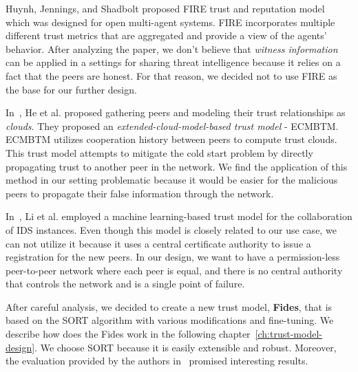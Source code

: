 Huynh, Jennings, and Shadbolt proposed FIRE trust and reputation model~\cite{huynh2006integrated} which was designed for open multi-agent systems.
FIRE incorporates multiple different trust metrics that are aggregated and provide a view of the agents' behavior.
After analyzing the paper, we don't believe that \textit{witness information}~\cite{huynh2006integrated} can be applied in a settings for sharing threat intelligence because it relies on a fact that the peers are honest.
For that reason, we decided not to use FIRE as the base for our further design.

In~\cite{1562680}, He et al. proposed gathering peers and modeling their trust relationships as \textit{clouds}. They proposed an \textit{extended-cloud-model-based trust model} - ECMBTM.
ECMBTM utilizes cooperation history between peers to compute trust clouds. 
This trust model attempts to mitigate the cold start problem by directly propagating trust to another peer in the network.
We find the application of this method in our setting problematic because it would be easier for the malicious peers to propagate their false information through the network.

In~\cite{li2014design}, Li et al. employed a machine learning-based trust model for the collaboration of IDS instances.
Even though this model is closely related to our use case, we can not utilize it because it uses a central certificate authority to issue a registration for the new peers. 
In our design, we want to have a permission-less peer-to-peer network where each peer is equal, and there is no central authority that controls the network and is a single point of failure.

\vspace{1cm}

\noindent
After careful analysis, we decided to create a new trust model, \textbf{Fides}, that is based on the SORT algorithm with various modifications and fine-tuning.
We describe how does the Fides work in the following chapter~\ref{ch:trust-model-design}.
We choose SORT because it is easily extensible and robust. 
Moreover, the evaluation provided by the authors in~\cite{sort} promised interesting results.